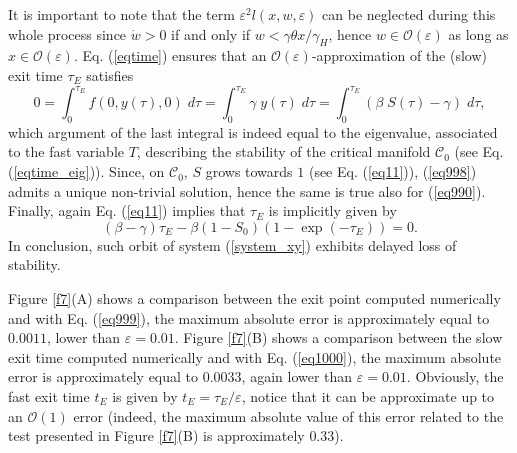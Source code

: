 \documentclass[11pt,reqno]{amsart}
\theoremstyle{boldremark}
\begin{document}
It is important to note that the term $\varepsilon^2 l(x,w,\varepsilon)$ can be neglected during this whole process since $\dot{w}>0$ if and only if $w < \gamma \theta x / \gamma_H$, hence $w \in \mathcal{O}(\varepsilon)$ as long as $x \in \mathcal{O}(\varepsilon)$. Eq. (\ref{eqtime}) ensures that an $\mathcal{O}(\varepsilon)$-approximation of the (slow) exit time $\tau_E$ satisfies 
\begin{equation} \label{eq998}
    0 = \int_0^{\tau_E} f(0,y(\tau),0) \; d\tau = \int_0^{\tau_E} \gamma \; y(\tau) \; d\tau = \int_0^{\tau_E} \left( \beta \; S(\tau)-\gamma \right) \; d\tau, 
\end{equation}
which argument of the last integral is indeed equal to the eigenvalue, associated to the fast variable $T$, describing the stability of the critical manifold $\mathcal{C}_0$ (see Eq. (\ref{eqtime_eig})). Since, on $\mathcal{C}_0$, $S$ grows towards $1$ (see Eq. (\ref{eq11})), (\ref{eq998}) admits a unique non-trivial solution, hence the same is true also for (\ref{eq990}). Finally, again Eq. (\ref{eq11}) implies that $\tau_E$ is implicitly given by 
\begin{equation} \label{eq1000}
    (\beta-\gamma)\tau_E - \beta (1-S_0)(1-\exp(-\tau_E))=0.
\end{equation}
In conclusion, such orbit of system (\ref{system_xy}) exhibits delayed loss of stability. 

Figure \ref{f7}(A) shows a comparison between the exit point computed numerically and with Eq. (\ref{eq999}), the maximum absolute error is approximately equal to $0.0011$, lower than $\varepsilon=0.01$. Figure \ref{f7}(B) shows a comparison between the slow exit time computed numerically and with Eq. (\ref{eq1000}), the maximum absolute error is approximately equal to $0.0033$, again lower than $\varepsilon=0.01$. Obviously, the fast exit time $t_E$ is given by $t_E=\tau_E/\varepsilon$, notice that it can be approximate up to an $\mathcal{O}(1)$ error (indeed, the maximum absolute value of this error related to the test presented in Figure \ref{f7}(B) is approximately $0.33$). 
\end{document}
